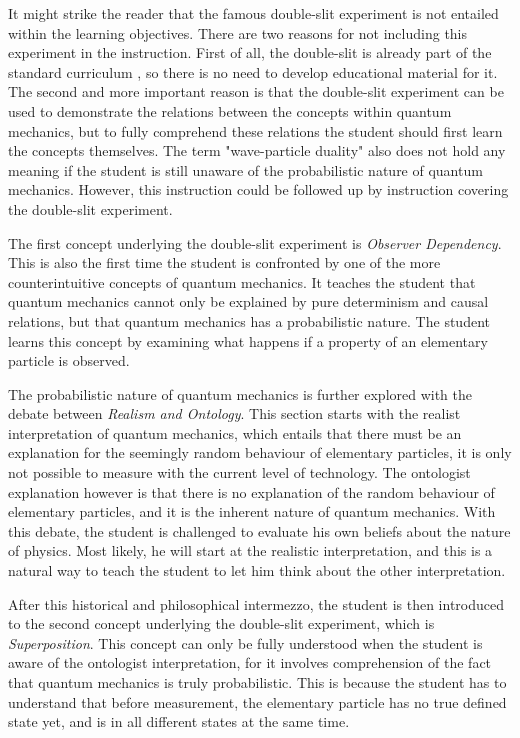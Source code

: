 \documentclass[11pt,twoside]{report} %
\begin{document}
It might strike the reader that the famous double-slit experiment is not entailed within the learning objectives. There are two reasons for not including this experiment in the instruction. First of all, the double-slit is already part of the standard curriculum \cite{eindexamen2015}, so there is no need to develop educational material for it. The second and more important reason is that the double-slit experiment can be used to demonstrate the relations between the concepts within quantum mechanics, but to fully comprehend these relations the student should first learn the concepts themselves. The term "wave-particle duality" also does not hold any meaning if the student is still unaware of the probabilistic nature of quantum mechanics. However, this instruction could be followed up by instruction covering the double-slit experiment.

The first concept underlying the double-slit experiment is \emph{Observer Dependency}. This is also the first time the student is confronted by one of the more counterintuitive concepts of quantum mechanics. It teaches the student that quantum mechanics cannot only be explained by pure determinism and causal relations, but that quantum mechanics has a probabilistic nature. The student learns this concept by examining what happens if a property of an elementary particle is observed.

The probabilistic nature of quantum mechanics is further explored with the debate between \emph{Realism and Ontology}. This section starts with the realist interpretation of quantum mechanics, which entails that there must be an explanation for the seemingly random behaviour of elementary particles, it is only not possible to measure with the current level of technology. The ontologist explanation however is that there is no explanation of the random behaviour of elementary particles, and it is the inherent nature of quantum mechanics. With this debate, the student is challenged to evaluate his own beliefs about the nature of physics. Most likely, he will start at the realistic interpretation, and this is a natural way to teach the student to let him think about the other interpretation.

After this historical and philosophical intermezzo, the student is then introduced to the second concept underlying the double-slit experiment, which is \emph{Superposition}. This concept can only be fully understood when the student is aware of the ontologist interpretation, for it involves comprehension of the fact that quantum mechanics is truly probabilistic. This is because the student has to understand that before measurement, the elementary particle has no true defined state yet, and is in all different states at the same time.
\end{document}
